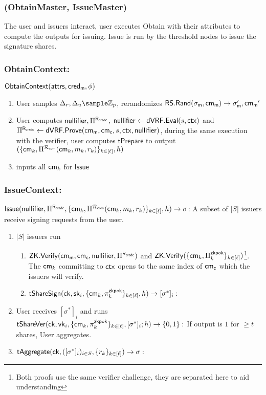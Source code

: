 \subsubsection*{(ObtainMaster, IssueMaster)}
The user and issuers interact, user executes Obtain with their attributes to compute the outputs for issuing. Issue is run by the threshold nodes to issue the signature shares.
\subsubsection*{ObtainContext:}
$\mathsf{ObtainContext}(\mathsf{attrs}, \mathsf{cred_m}, \phi)$
\begin{enumerate}
    \item User samples $\Delta_r, \Delta_u \sample \Z_p$, rerandomizes $\mathsf{RS.Rand}(\sigma_{\mathsf{m}}, \mathsf{cm_m}) \to \sigma_{\mathsf{m}}', \mathsf{cm_m}'$
    \item User computes $\mathsf{nullifier}, \Pi^{\mathsf{R}_{\mathsf{credc}}}$, $\mathsf{nullifier} \gets \mathsf{dVRF.Eval}(s, \mathsf{ctx})$ and $\Pi^{\mathsf{R}_{\mathsf{credc}}} \gets \mathsf{dVRF.Prove}(\mathsf{cm_m}, \mathsf{cm_c}, s, \mathsf{ctx}, \mathsf{nullifier})$, during the same execution with the verifier, user computes  $\mathsf{tPrepare}$ to output $(\{\mathsf{cm}_k, \Pi^{\mathcal{R}_{\mathsf{com}}}(\mathsf{cm}_k, m_k, r_k)\}_{k \in [\ell]}, h)$
    \item inputs all $\mathsf{cm}_k$ for $\mathsf{Issue}$
\end{enumerate}

\subsubsection{IssueContext:}
$\mathsf{Issue}(\mathsf{nullifier}, \Pi^{\mathsf{R}_{\mathsf{credc}}}, \{\mathsf{cm}_k, \Pi^{\mathcal{R}_{\mathsf{com}}}(\mathsf{cm}_k, m_k, r_k)\}_{k \in [\ell]}, h) \to \sigma$: A subset of $|S|$ issuers receive signing requests from the user. 
\begin{enumerate}
    \item $|S|$ issuers run 
    \begin{enumerate}
        \item $\mathsf{ZK.Verify}(\mathsf{cm_m}, \mathsf{cm_c}, \mathsf{nullifier}, \Pi^{\mathsf{R}_{\mathsf{credc}}})$ and $\mathsf{ZK.Verify}(\{\mathsf{cm}_k, \Pi_k^{\mathsf{zkpok}}\}_{k \in [\ell]})$\footnote{Both proofs use the same verifier challenge, they are separated here to aid understanding}. The $\mathsf{cm}_k$ committing to $\mathsf{ctx}$ opens to the same index of $\mathsf{cm_c}$ which the issuers will verify.
        \item $\mathsf{tShareSign}(\mathsf{ck}, \mathsf{sk}_i, \{\mathsf{cm}_k, \pi_k^{\mathsf{zkpok}}\}_{k \in [\ell]}, h) \to [\sigma^*]_i:$
    \end{enumerate}
    \item User receives $[\sigma^*]_i$ and runs $\mathsf{tShareVer}(\mathsf{ck}, \mathsf{vk}_i, \{\mathsf{cm}_k, \pi_k^{\mathsf{zkpok}}\}_{k \in [\ell]}, [\sigma^*]_i; h) \to \{0,1\}:$ If output is $1$ for $\geq t$ shares, User aggregates.
    \item $\mathsf{tAggregate}(\mathsf{ck}, ([\sigma^*]_i)_{i \in S}, \{r_k\}_{k \in [\ell]}) \to \sigma:$
\end{enumerate}

